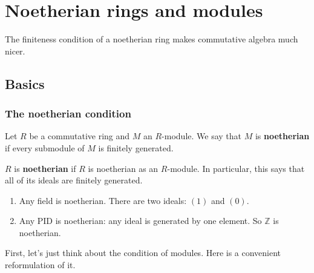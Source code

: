 \chapter{Noetherian rings and modules}

The finiteness condition of a noetherian ring makes commutative algebra much
nicer.

\section{Basics}

\subsection{The noetherian condition}
\begin{definition} 
Let $R$ be a commutative ring and $M$ an $R$-module. We say that $M$ is
\textbf{noetherian} if every submodule of $M$ is finitely generated.
\end{definition} 

\begin{definition} 
$R$ is \textbf{noetherian} if $R$ is noetherian as an $R$-module. In
particular, this says that all of its ideals are finitely generated.
\end{definition} 

\begin{example} 
\begin{enumerate}
\item Any field is noetherian. There are two ideals: $(1)$ and $(0)$. 
\item Any PID is noetherian: any ideal is generated by one element. So
$\mathbb{Z}$ is noetherian.
\end{enumerate}
\end{example} 

First, let's just think about the condition of modules. Here is a convenient
reformulation of it.

